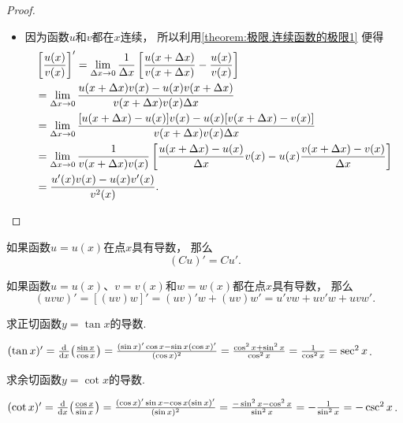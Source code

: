 \begin{theorem}
\begin{proof}
\begin{itemize}
\item 因为函数\(u\)和\(v\)都在\(x\)连续，
所以利用\cref{theorem:极限.连续函数的极限1} 便得
\begin{align*}
&\left[ \frac{u(x)}{v(x)} \right]'
= \lim_{\Delta x\to0} \frac{1}{\Delta x} \left[
 \frac{u(x+\Delta x)}{v(x+\Delta x)} - \frac{u(x)}{v(x)}
 \right] \\
&= \lim_{\Delta x\to0} \frac{u(x+\Delta x) v(x) - u(x) v(x+\Delta x)}{v(x+\Delta x) v(x) \Delta x} \\
&= \lim_{\Delta x\to0} \frac{[u(x+\Delta x) - u(x)] v(x) - u(x) [v(x+\Delta x) - v(x)]}{v(x+\Delta x) v(x) \Delta x} \\
&= \lim_{\Delta x\to0} \frac{1}{v(x+\Delta x) v(x)} \left[
 \frac{u(x+\Delta x) - u(x)}{\Delta x} v(x) - u(x) \frac{v(x+\Delta x) - v(x)}{\Delta x}
 \right] \\
&= \frac{u'(x) v(x) - u(x) v'(x)}{v^2(x)}.
\qedhere
\end{align*}
\end{itemize}
\end{proof}
\end{theorem}

\begin{corollary}
如果函数\(u=u(x)\)在点\(x\)具有导数，
那么\[
	(C u)' = C u'.
\]
\end{corollary}

\begin{corollary}
如果函数\(u=u(x)\)、\(v=v(x)\)和\(w=w(x)\)都在点\(x\)具有导数，
那么\[
	(uvw)'
	= [(uv)w]'
	= (uv)'w + (uv)w'
	= u'vw + uv'w + uvw'.
\]
\end{corollary}

\begin{example}
求正切函数\(y=\tan x\)的导数.
\begin{solution}
\((\tan x)'
= \dv{x}(\frac{\sin x}{\cos x})
= \frac{(\sin x)' \cos x - \sin x (\cos x)'}{(\cos x)^2}
= \frac{\cos^2 x + \sin^2 x}{\cos^2 x}
= \frac{1}{\cos^2 x}
= \sec^2 x\).
\end{solution}
\end{example}

\begin{example}
求余切函数\(y = \cot x\)的导数.
\begin{solution}
\((\cot x)'
= \dv{x}(\frac{\cos x}{\sin x})
= \frac{(\cos x)' \sin x - \cos x (\sin x)'}{(\sin x)^2}
= \frac{-\sin^2 x-\cos^2 x}{\sin^2 x}
= -\frac1{\sin^2 x}
= -\csc^2 x\).
\end{solution}
\end{example}

